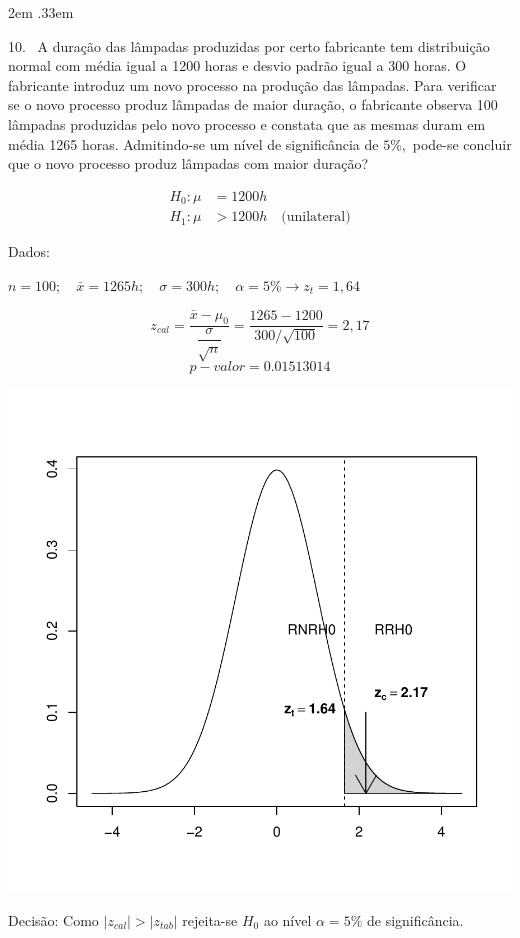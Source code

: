 \documentclass{article}
\newenvironment{ManualExercise}
  {\begin{list}{}{\leftmargin \QuestionIndent
    \partopsep0pt \parsep\parskip \topsep\QuestionBefore
    \itemsep\QuestionBefore \labelwidth2em
    \labelsep.33em
    \usecounter{Question}}}
  {\end{list}}
\begin{document}
\begin{Exercise}
\begin{ManualExercise}
\item[10.~]A duração das lâmpadas produzidas por certo fabricante tem distribuição normal com média igual a 1200 horas e desvio padrão igual a 300 horas. O fabricante introduz um novo processo na produção das lâmpadas. Para verificar se o novo processo produz lâmpadas de maior duração, o fabricante observa 100 lâmpadas produzidas pelo novo processo e constata que as mesmas duram em média 1265 horas. Admitindo-se um nível de significância de $5\%,$ pode-se concluir que o novo processo produz lâmpadas com maior duração?

\begin{align*}
H_{0}: \mu&=1200h \\ 
H_{1}: \mu&>1200h\quad \textrm{(unilateral)}
\end{align*}

Dados:

$n=100;\quad \bar{x}=1265h;\quad \sigma=300h;\quad \alpha=5\% \rightarrow z_{t}=1,64$

$$z_{cal}=\dfrac{\bar{x}-\mu_{0}}{\dfrac{\sigma}{\sqrt{n}}}=\dfrac{1265-1200}{300/\sqrt{100}}=2,17$$
$$p-valor=0.01513014$$
\begin{center}
\includegraphics{TH-003}
\end{center}

Decisão: Como $|z_{cal}|>|z_{tab}|$ rejeita-se $H_{0}$ ao nível $\alpha=5\%$ de significância.


\end{ManualExercise}
\end{Exercise}
\end{document}
